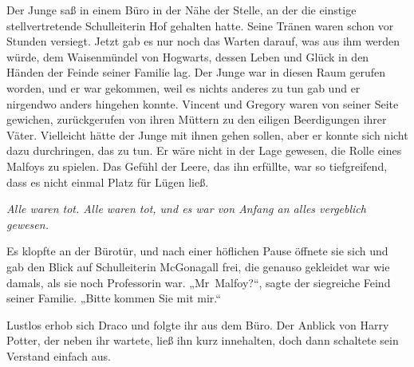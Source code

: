 Der Junge saß in einem Büro in der Nähe der Stelle, an der die einstige stellvertretende Schulleiterin Hof gehalten hatte. Seine Tränen waren schon vor Stunden versiegt. Jetzt gab es nur noch das Warten darauf, was aus ihm werden würde, dem Waisenmündel von Hogwarts, dessen Leben und Glück in den Händen der Feinde seiner Familie lag. Der Junge war in diesen Raum gerufen worden, und er war gekommen, weil es nichts anderes zu tun gab und er nirgendwo anders hingehen konnte. Vincent und Gregory waren von seiner Seite gewichen, zurückgerufen von ihren Müttern zu den eiligen Beerdigungen ihrer Väter. Vielleicht hätte der Junge mit ihnen gehen sollen, aber er konnte sich nicht dazu durchringen, das zu tun. Er wäre nicht in der Lage gewesen, die Rolle eines Malfoys zu spielen. Das Gefühl der Leere, das ihn erfüllte, war so tiefgreifend, dass es nicht einmal Platz für Lügen ließ.

\emph{Alle waren tot. Alle waren tot, und es war von Anfang an alles vergeblich gewesen.}

Es klopfte an der Bürotür, und nach einer höflichen Pause öffnete sie sich und gab den Blick auf Schulleiterin McGonagall frei, die genauso gekleidet war wie damals, als sie noch Professorin war.
„Mr~Malfoy?“, sagte der siegreiche Feind seiner Familie.
„Bitte kommen Sie mit mir.“

Lustlos erhob sich Draco und folgte ihr aus dem Büro. Der Anblick von Harry Potter, der neben ihr wartete, ließ ihn kurz innehalten, doch dann schaltete sein Verstand einfach aus.

